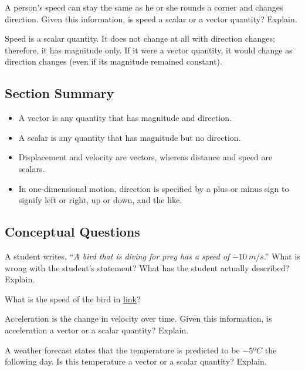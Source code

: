 \documentclass[
]{book}
\providecommand{\tightlist}{%
  \setlength{\itemsep}{0pt}\setlength{\parskip}{0pt}}
\newenvironment{conceptual-questions}{}{}
\begin{document}
\leavevmode\hypertarget{fs-id1765357}{}%
A person's speed can stay the same as he or she rounds a corner and
changes direction. Given this information, is speed a scalar or a vector
quantity? Explain.

\leavevmode\hypertarget{fs-id2007066}{}%
Speed is a scalar quantity. It does not change at all with direction
changes; therefore, it has magnitude only. If it were a vector quantity,
it would change as direction changes (even if its magnitude remained
constant).

\hypertarget{fs-id1784568-summary}{}
\hypertarget{section-summary-1}{%
\subsection{Section Summary}\label{section-summary-1}}

\begin{itemize}
\tightlist
\item
  \protect\hypertarget{import-auto-id1534176}{}{A vector is any quantity that has magnitude and
  direction.}
\item
  \protect\hypertarget{import-auto-id1777731}{}{A scalar is any quantity that has magnitude but no
  direction.}
\item
  \protect\hypertarget{import-auto-id1416292}{}{Displacement and velocity are vectors, whereas distance and speed
  are scalars.}
\item
  \protect\hypertarget{import-auto-id1739033}{}{In one-dimensional motion, direction is specified by a plus or
  minus sign to signify left or right, up or down, and the
  like.}
\end{itemize}

\hypertarget{fs-id1799980}{}
\begin{conceptual-questions}

\hypertarget{conceptual-questions-1}{%
\subsection{Conceptual Questions}\label{conceptual-questions-1}}

\hypertarget{fs-id1364975}{}
\leavevmode\hypertarget{fs-id1770280}{}%
A student writes, ``\emph{A bird that is diving for prey has a speed of}
\({- \textit{10}\ {m/s}}{}\).'' What is wrong with the student's
statement? What has the student actually described? Explain.

\hypertarget{fs-id1773292}{}
\leavevmode\hypertarget{fs-id1706742}{}%
What is the speed of the bird in
\protect\hyperlink{fs-id1364975}{link}?

\hypertarget{fs-id1247502}{}
\leavevmode\hypertarget{fs-id1777549}{}%
Acceleration is the change in velocity over time. Given this
information, is acceleration a vector or a scalar quantity? Explain.

\hypertarget{fs-id1548043}{}
\leavevmode\hypertarget{fs-id1778185}{}%
A weather forecast states that the temperature is predicted to be
\({- 5ºC}{}\) the following day. Is this temperature a vector or a scalar
quantity? Explain.

\end{conceptual-questions}
\end{document}

